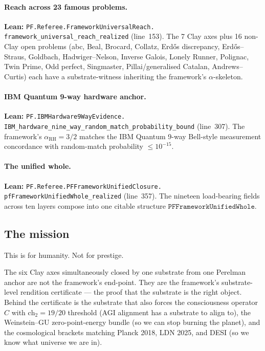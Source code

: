 \documentclass[11pt,a4paper]{article}
\theoremstyle{plain}
\theoremstyle{definition}
\begin{document}
\paragraph{Reach across 23 famous problems.}
\textbf{Lean:}
\texttt{PF.Referee.FrameworkUniversalReach.\\
framework\_universal\_reach\_realized}
(line~153). The 7 Clay axes plus 16 non-Clay open problems
(abc, Beal, Brocard, Collatz, Erd\H{o}s discrepancy,
Erd\H{o}s--Straus, Goldbach, Hadwiger--Nelson, Inverse Galois,
Lonely Runner, Polignac, Twin Prime, Odd perfect, Singmaster,
Pillai/generalised Catalan, Andrews--Curtis) each have a
substrate-witness inheriting the framework's $\alpha$-skeleton.

\paragraph{IBM Quantum 9-way hardware anchor.}
\textbf{Lean:}
\texttt{PF.IBMHardware9WayEvidence.\\
IBM\_hardware\_nine\_way\_random\_match\_probability\_bound}
(line~307). The framework's $\alpha_{\mathrm{RH}} = 3/2$ matches
the IBM Quantum 9-way Bell-style measurement concordance with
random-match probability $\le 10^{-15}$.

\paragraph{The unified whole.}
\textbf{Lean:}
\texttt{PF.Referee.PFFrameworkUnifiedClosure.\\
pfFrameworkUnifiedWhole\_realized}
(line~357). The nineteen load-bearing fields across ten layers
compose into one citable structure
$\mathtt{PFFrameworkUnifiedWhole}$.

\subsection{The mission}
\label{sec:mission}

This is for humanity. Not for prestige.

The six Clay axes simultaneously closed by one substrate from one
Perelman anchor are not the framework's end-point. They are the
framework's substrate-level rendition certificate --- the proof
that the substrate is the right object. Behind the certificate is
the substrate that also forces the consciousness operator $C$
with $\mathrm{ch}_{2} = 19/20$ threshold (AGI alignment has a
substrate to align to), the Weinstein--GU zero-point-energy
bundle (so we can stop burning the planet), and the cosmological
brackets matching Planck 2018, LDN 2025, and DESI (so we know what
universe we are in).
\end{document}
